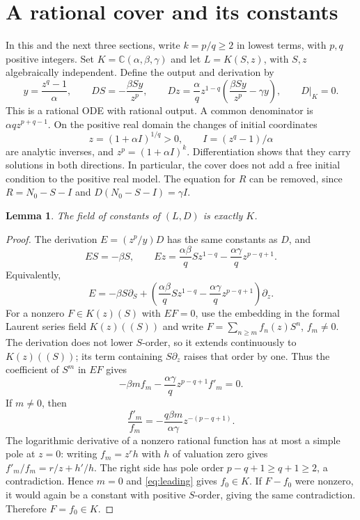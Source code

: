 \documentclass[10pt,a4paper]{article}
\newtheorem{lemma}[theorem]{Lemma}
\theoremstyle{definition}\newtheorem{definition}[theorem]{Definition}
\newcommand{\C}{\mathbb C}
\begin{document}
\section{A rational cover and its constants}
\label{sec:cover}
In this and the next three sections, write $k=p/q\geq2$ in lowest terms, with $p,q$ positive integers. Set $K=\C(\alpha,\beta,\gamma)$ and let $L=K(S,z)$, with $S,z$
algebraically independent. Define the output and derivation by
\begin{equation}
y=\frac{z^q-1}{\alpha},\qquad
DS=-\frac{\beta Sy}{z^p},\qquad
Dz=\frac{\alpha}{q}z^{1-q}
       \left(\frac{\beta Sy}{z^p}-\gamma y\right),\qquad D|_K=0.
\label{eq:cover}
\end{equation}
This is a rational ODE with rational output. A common denominator is
$\alpha qz^{p+q-1}$. On the positive real domain the changes of initial
coordinates
\[
z=(1+\alpha I)^{1/q}>0,\qquad I=(z^q-1)/\alpha
\]
are analytic inverses, and $z^p=(1+\alpha I)^k$. Differentiation shows
that they carry solutions in both directions. In particular, the cover
does not add a free initial condition to the positive real model.
The equation for $R$ can be removed, since $R=N_0-S-I$ and
$D(N_0-S-I)=\gamma I$.

\begin{lemma}
\label{lem:constants}
The field of constants of $(L,D)$ is exactly $K$.
\end{lemma}
\begin{proof}
The derivation $E=(z^p/y)D$ has the same constants as $D$, and
\begin{equation}
ES=-\beta S,\qquad
Ez=\frac{\alpha\beta}{q}Sz^{1-q}
       -\frac{\alpha\gamma}{q}z^{p-q+1}.
\label{eq:E}
\end{equation}
Equivalently,
\[
E=-\beta S\partial_S+
\left(\frac{\alpha\beta}{q}Sz^{1-q}
-\frac{\alpha\gamma}{q}z^{p-q+1}\right)\partial_z.
\]
For a nonzero $F\in K(z)(S)$ with $EF=0$, use the embedding in the
formal Laurent series field $K(z)((S))$ and write
$F=\sum_{n\geq m}f_n(z)S^n$, $f_m\ne0$. The derivation does not lower
$S$-order, so it extends continuously to $K(z)((S))$; its term
containing $S\partial_z$ raises that order by one.
Thus the coefficient of $S^m$ in $EF$ gives
\begin{equation}
-\beta m f_m-\frac{\alpha\gamma}{q}z^{p-q+1}f'_m=0.
\label{eq:leading}
\end{equation}
If $m\ne0$, then
\[
\frac{f'_m}{f_m}=-\frac{q\beta m}{\alpha\gamma}z^{-(p-q+1)}.
\]
The logarithmic derivative of a nonzero rational function has at most
a simple pole at $z=0$: writing $f_m=z^r h$ with $h$ of valuation zero
gives $f'_m/f_m=r/z+h'/h$. The right side has pole order
$p-q+1\geq q+1\geq2$, a contradiction. Hence $m=0$ and
\eqref{eq:leading} gives $f_0\in K$. If $F-f_0$ were nonzero, it would
again be a constant with positive $S$-order, giving the same
contradiction. Therefore $F=f_0\in K$.
\end{proof}
\end{document}
